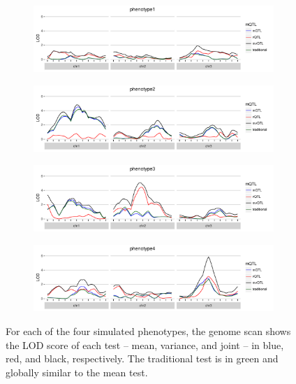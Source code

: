 \documentclass[9pt,twocolumn,twoside]{gsag3jnl}
\begin{document}
\begin{figure}[ht!]
    \begin{subfigure}{0.5\textwidth}
        \includegraphics[width=\textwidth]{images/LOD_scan_phenotype1.pdf}
    \end{subfigure}

    \begin{subfigure}[b]{0.5\textwidth}
        \includegraphics[width=\textwidth]{images/LOD_scan_phenotype2.pdf}
    \end{subfigure}

    \begin{subfigure}[b]{0.5\textwidth}
        \includegraphics[width=\textwidth]{images/LOD_scan_phenotype3.pdf}
    \end{subfigure}
    
    \begin{subfigure}[b]{0.5\textwidth}
        \includegraphics[width=\textwidth]{images/LOD_scan_phenotype4.pdf}
    \end{subfigure}
    
    \caption{For each of the four simulated phenotypes, the genome scan shows the LOD score of each test -- mean, variance, and joint -- in blue, red, and black, respectively.  The traditional test is in green and globally similar to the mean test. \label{fig:lod_score_scans}}
\end{figure}
\end{document}
